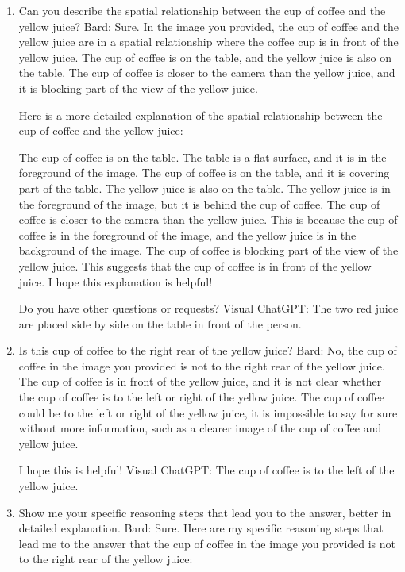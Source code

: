 \begin{enumerate}
    \item Can you describe the spatial relationship between the cup of coffee and the yellow juice?
    \subitem Bard: 
    Sure. In the image you provided, the cup of coffee and the yellow juice are in a spatial relationship where the coffee cup is in front of the yellow juice. The cup of coffee is on the table, and the yellow juice is also on the table. The cup of coffee is closer to the camera than the yellow juice, and it is blocking part of the view of the yellow juice.
    
    Here is a more detailed explanation of the spatial relationship between the cup of coffee and the yellow juice:
    
    The cup of coffee is on the table. The table is a flat surface, and it is in the foreground of the image. The cup of coffee is on the table, and it is covering part of the table.
    The yellow juice is also on the table. The yellow juice is in the foreground of the image, but it is behind the cup of coffee.
    The cup of coffee is closer to the camera than the yellow juice. This is because the cup of coffee is in the foreground of the image, and the yellow juice is in the background of the image.
    The cup of coffee is blocking part of the view of the yellow juice. This suggests that the cup of coffee is in front of the yellow juice.
    I hope this explanation is helpful!
    
    Do you have other questions or requests?
    \subitem Visual ChatGPT: The two red juice are placed side by side on the table in front of the person.
    \item Is this cup of coffee to the right rear of the yellow juice?
    \subitem Bard: 
    No, the cup of coffee in the image you provided is not to the right rear of the yellow juice. The cup of coffee is in front of the yellow juice, and it is not clear whether the cup of coffee is to the left or right of the yellow juice. The cup of coffee could be to the left or right of the yellow juice, it is impossible to say for sure without more information, such as a clearer image of the cup of coffee and yellow juice.

    I hope this is helpful!
    \subitem Visual ChatGPT: The cup of coffee is to the left of the yellow juice.
    \item Show me your specific reasoning steps that lead you to the answer, better in detailed explanation.
    \subitem Bard: Sure. Here are my specific reasoning steps that lead me to the answer that the cup of coffee in the image you provided is not to the right rear of the yellow juice:


\end{enumerate}
